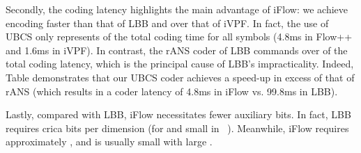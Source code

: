 \documentclass{article}
\begin{document}
Secondly, the coding latency highlights the main advantage of iFlow: we achieve encoding  faster than that of LBB and over  that of iVPF. In fact, the use of UBCS only represents  of the total coding time for all symbols (4.8ms in Flow++ and 1.6ms in iVPF).
In contrast, the rANS coder of LBB commands over  of the total coding latency, which is the principal cause of LBB's impracticality. Indeed, Table  demonstrates that our UBCS coder achieves a speed-up in excess of  that of rANS (which results in a coder latency of 4.8ms in iFlow vs. 99.8ms in LBB). 


Lastly, compared with LBB, iFlow necessitates fewer auxiliary bits. In fact, LBB requires crica  bits per dimension (for  and small  in ~\cite{ho2019compression}). Meanwhile, iFlow requires approximately , and  is usually small with large .
\end{document}
